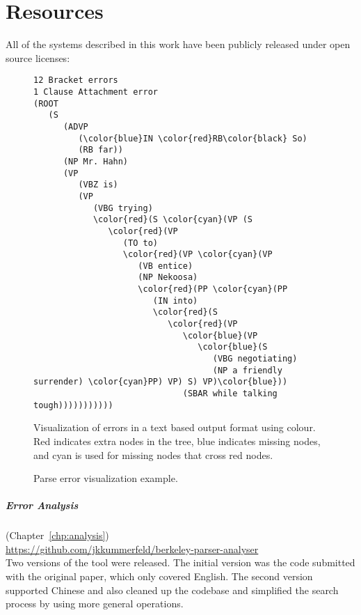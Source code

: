 \chapter{Resources} \label{chp:resources}

All of the systems described in this work have been publicly released under open source licenses:

\begin{figure}
{\footnotesize
  \begin{Verbatim}[commandchars=\\\{\},codes={\catcode`$=3\catcode`^=7\catcode`_=8}]
12 Bracket errors
1 Clause Attachment error
(ROOT
   (S
      (ADVP
         (\color{blue}IN \color{red}RB\color{black} So)
         (RB far))
      (NP Mr. Hahn)
      (VP
         (VBZ is)
         (VP
            (VBG trying)
            \color{red}(S \color{cyan}(VP (S
               \color{red}(VP
                  (TO to)
                  \color{red}(VP \color{cyan}(VP
                     (VB entice)
                     (NP Nekoosa)
                     \color{red}(PP \color{cyan}(PP
                        (IN into)
                        \color{red}(S
                           \color{red}(VP
                              \color{blue}(VP
                                 \color{blue}(S
                                    (VBG negotiating)
                                    (NP a friendly surrender) \color{cyan}PP) VP) S) VP)\color{blue}))
                              (SBAR while talking tough)))))))))))
\end{Verbatim}
}
\caption{\label{fig:error-vis}
Parse error visualization example.
}{
Visualization of errors in a text based output format using colour.
Red indicates extra nodes in the tree, blue indicates missing nodes, and cyan is used for missing nodes that cross red nodes.
}
\end{figure}

\paragraph{Error Analysis} (Chapter~\ref{chp:analysis}) \\
\url{https://github.com/jkkummerfeld/berkeley-parser-analyser} \\
Two versions of the tool were released.
The initial version was the code submitted with the original paper, which only covered English.
The second version supported Chinese and also cleaned up the codebase and simplified the search process by using more general operations.

